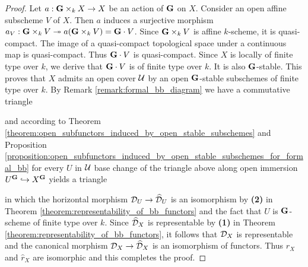 \begin{proof}
Let $a:\mathbf{G}\times_kX\rightarrow X$ be an action of $\mathbf{G}$ on $X$. Consider an open affine subscheme $V$ of $X$. Then $a$ induces a surjective morphism $a_V:\mathbf{G}\times_k V\twoheadrightarrow a(\mathbf{G}\times_k V) = \mathbf{G}\cdot V$. Since $\mathbf{G}\times_k V$ is affine $k$-scheme, it is quasi-compact. The image of a quasi-compact topological space under a continuous map is quasi-compact. Thus $\mathbf{G}\cdot V$ is quasi-compact. Since $X$ is locally of finite type over $k$, we derive that $\mathbf{G}\cdot V$ is of finite type over $k$. It is also $\mathbf{G}$-stable. This proves that $X$ admits an open cover ${\mathcal U}$ by an open $\mathbf{G}$-stable subschemes of finite type over $k$. By Remark \ref{remark:formal_bb_diagram} we have a commutative triangle
\begin{center}
\end{center}
and according to Theorem \ref{theorem:open_subfunctors_induced_by_open_stable_subschemes} and Proposition \ref{proposition:open_subfunctors_induced_by_open_stable_subschemes_for_formal_bb} for every $U$ in ${\mathcal U}$ base change of the triangle above along open immersion $U^{\mathbf{G}}\hookrightarrow X^{\mathbf{G}}$ yields a triangle
\begin{center}
\end{center}
in which the horizontal morphism ${\mathcal D}_U\rightarrow \widehat{{\mathcal D}}_U$ is an isomorphism by \textbf{(2)} in Theorem \ref{theorem:representability_of_bb_functors} and the fact that $U$ is $\mathbf{G}$-scheme of finite type over $k$. Since $\widehat{{\mathcal D}}_X$ is representable by \textbf{(1)} in Theorem \ref{theorem:representability_of_bb_functors}, it follows that ${\mathcal D}_X$ is representable and the canonical morphism ${\mathcal D}_X\rightarrow \widehat{{\mathcal D}}_X$ is an isomorphism of functors. Thus $r_X$ and $\widehat{r}_X$ are isomorphic and this completes the proof.
\end{proof}
